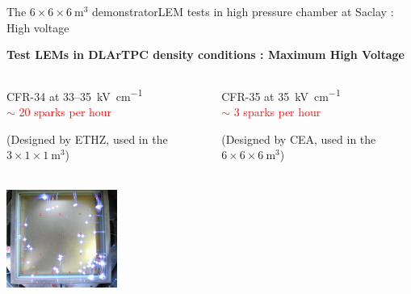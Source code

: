 \documentclass[10pt]{beamer}
\begin{document}
    \begin{frame}{The \texorpdfstring{$6 \times 6 \times \SI{6}{\meter\cubed}$}{666} demonstrator}{LEM tests in high pressure chamber at Saclay : High voltage}
    	\begin{center}
	    	\begin{scriptsize}
	    		\textbf{Test LEMs in DLArTPC density conditions : Maximum High Voltage}
	    	\end{scriptsize} 
	    \end{center}
	    \vspace{-0.5cm}
   		\begin{columns}
    		\begin{column}{0.5\textwidth}
    			\begin{center}
	    			\begin{scriptsize}
		    			CFR-34 at 33--\SI{35}{\kilo\volt\per\centi\meter}\\
		    			\textcolor{red}{$\sim$ 20 sparks per hour}\\
		    		\end{scriptsize}
	    			\begin{tiny}
		    			(Designed by ETHZ, used in the $3 \times 1 \times \SI{1}{\meter\cubed}$)
		    		\end{tiny}\\
	    			\includegraphics[height=3.2cm]{figures/666/sparks_34.png}
    			\end{center}
    		\end{column}\hfill
    		\begin{column}{0.5\textwidth}
    			\begin{center}
	    			\begin{scriptsize}
		    			CFR-35 at \SI{35}{\kilo\volt\per\centi\meter} \\
		    			\textcolor{red}{$\sim$ 3 sparks per hour}\\
		    		\end{scriptsize}
	    			\begin{tiny}
	    				(Designed by CEA, used in the $6 \times 6 \times \SI{6}{\meter\cubed}$)
	   				\end{tiny}\\

\end{center}
\end{column}
\end{columns}
\end{frame}
\end{document}
